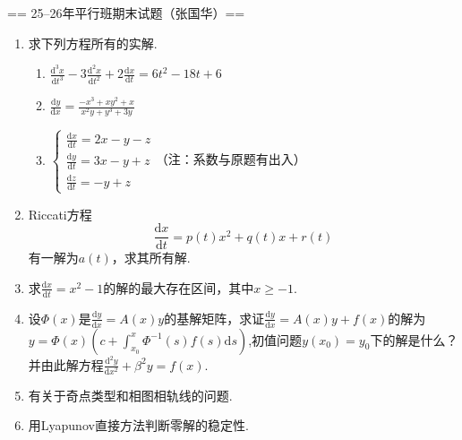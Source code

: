== 25--26年平行班期末试题（张国华）==
\begin{enumerate}
    \item 求下列方程所有的实解.
    \begin{enumerate}[label=(\arabic*)]
        \item $\frac{\text{d}^3x}{\text{d}t^3}-3\frac{\text{d}^2x}{\text{d}t^2}+2\frac{\text{d}x}{\text{d}t}=6t^2-18t+6$
        \item $\frac{\text{d}y}{\text{d}x}=\frac{-x^3+xy^2+x}{x^2y+y^3+3y}$
        \item $\begin{cases}
            \frac{\text{d}x}{\text{d}t}=2x-y-z\\
            \frac{\text{d}y}{\text{d}t}=3x-y+z\\
            \frac{\text{d}z}{\text{d}t}=-y+z
        \end{cases}$（注：系数与原题有出入）
    \end{enumerate}
    \item Riccati方程$$\frac{\text{d}x}{\text{d}t}=p(t)x^2+q(t)x+r(t)$$有一解为$a(t)$，求其所有解.
    \item 求$\frac{\text{d}x}{\text{d}t}=x^2-1$的解的最大存在区间，其中$x\geqslant -1$.
    \item 设$\Phi(x)$是$\frac{\text{d}y}{\text{d}x}=A(x)y$的基解矩阵，求证$\frac{\text{d}y}{\text{d}x}=A(x)y+f(x)$的解为$y=\Phi(x)(c+\int_{x_0}^x\Phi^{-1}(s)f(s)\text{d}s)$,初值问题$y(x_0)=y_0$下的解是什么？
    并由此解方程$\frac{\text{d}^2y}{\text{d}x^2}+\beta^2y=f(x)$.
    \item 有关于奇点类型和相图相轨线的问题.
    \item 用Lyapunov直接方法判断零解的稳定性.
\end{enumerate}


